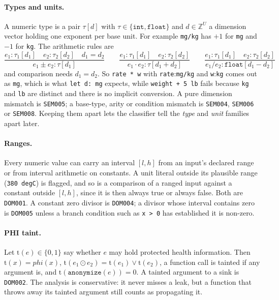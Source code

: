 \documentclass[12pt,a4paper]{article}
\newcommand{\code}[1]{\texttt{#1}}
\begin{document}
\paragraph{Types and units.} A numeric type is a pair $\tau[d]$ with $\tau\in\{\texttt{int},\texttt{float}\}$ and
$d\in\mathbb{Z}^{U}$ a dimension vector holding one exponent per base unit. For example \code{mg/kg} has $+1$ for
\code{mg} and $-1$ for \code{kg}. The arithmetic rules are
\begin{equation}
\frac{e_1:\tau_1[d_1]\quad e_2:\tau_2[d_2]\quad d_1=d_2}{e_1\pm e_2:\tau[d_1]}\qquad
\frac{e_1:\tau_1[d_1]\quad e_2:\tau_2[d_2]}{e_1\cdot e_2:\tau[d_1+d_2]}\qquad
\frac{e_1:\tau_1[d_1]\quad e_2:\tau_2[d_2]}{e_1/e_2:\texttt{float}[d_1-d_2]}
\end{equation}
and comparison needs $d_1=d_2$. So \code{rate * w} with \code{rate}:\code{mg/kg} and \code{w}:\code{kg} comes out as
\code{mg}, which is what \code{let d: mg} expects, while \code{weight + 5 lb} fails because \code{kg} and \code{lb} are
distinct and there is no implicit conversion. A pure dimension mismatch is \code{SEM005}; a base-type, arity or
condition mismatch is \code{SEM004}, \code{SEM006} or \code{SEM008}. Keeping them apart lets the classifier tell the
\emph{type} and \emph{unit} families apart later.

\paragraph{Ranges.} Every numeric value can carry an interval $[l,h]$ from an input's declared range or from interval
arithmetic on constants. A unit literal outside its plausible range (\code{380 degC}) is flagged, and so is a comparison
of a ranged input against a constant outside $[l,h]$, since it is then always true or always false. Both are
\code{DOM001}. A constant zero divisor is \code{DOM004}; a divisor whose interval contains zero is \code{DOM005} unless
a branch condition such as \code{x > 0} has established it is non-zero.

\paragraph{PHI taint.} Let $\mathrm{t}(e)\in\{0,1\}$ say whether $e$ may hold protected health information. Then
$\mathrm{t}(x)=\mathit{phi}(x)$, $\mathrm{t}(e_1\odot e_2)=\mathrm{t}(e_1)\lor\mathrm{t}(e_2)$, a function call is
tainted if any argument is, and $\mathrm{t}(\texttt{anonymize}(e))=0$. A tainted argument to a sink is \code{DOM002}.
The analysis is conservative: it never misses a leak, but a function that throws away its tainted argument still counts
as propagating it.
\end{document}
